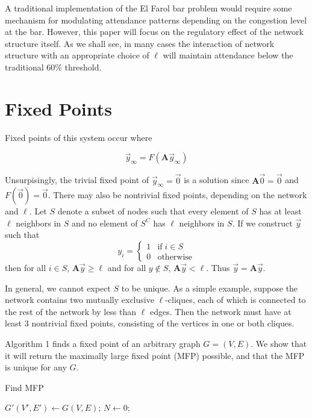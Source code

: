 \documentclass[12pt]{article}
\begin{document}
A traditional implementation of the El Farol bar problem would require some mechanism for modulating attendance patterns depending on the congestion level at the bar.  However, this paper will focus on the regulatory effect of the network structure itself.  As we shall see, in many cases the interaction of network structure with an appropriate choice of $\ell$ will maintain attendance below the traditional 60\% threshold. 

\section{Fixed Points}

Fixed points of this system occur where

\begin{equation}
  \vec{y}_{\infty} = F(\mathbf{A}\vec{y}_{\infty})
\end{equation}

Unsurpisingly, the trivial fixed point of $\vec{y}_{\infty} = \vec{0}$ is a solution since $\mathbf{A}\vec{0} = \vec{0}$ and $F(\vec{0}) = \vec{0}$.  There may also be nontrivial fixed points, depending on the network and $\ell$.  Let $S$ denote a subset of nodes such that every element of $S$ has at least $\ell$ neighbors in $S$ and no element of $S^C$ has $\ell$ neighbors in $S$.  If we construct $\vec{y}$ such that  
\begin{equation}
  y_i = \begin{cases}
    1 &\text{if} \; i \in S \\
    0 &\text{otherwise}
  \end{cases}
\end{equation}
 then for all $i \in S$, $\mathbf{A}\vec{y} \geq \ell$ and for all $y \notin S$, $\mathbf{A}\vec{y} < \ell$.  Thus $\vec{y} = \mathbf{A}\vec{y}$. 

In general, we cannot expect $S$ to be unique.  As a simple example, suppose the network contains two mutually exclusive $\ell$-cliques, each of which is connected to the rest of the network by less than $\ell$ edges.  Then the network must have at least 3 nontrivial fixed points, consisting of the vertices in one or both cliques.

Algorithm 1 finds a fixed point of an arbitrary graph $G=(V,E)$.  We show that it will return the maximally large fixed point (MFP) possible, and that the MFP is unique for any $G$.

\begin{algorithm}
  \caption{Find MFP}\label{alg:two}
  $G'(V', E') \gets G(V, E)$;
  $N \gets 0$;
  \end{algorithm}
\end{document}
